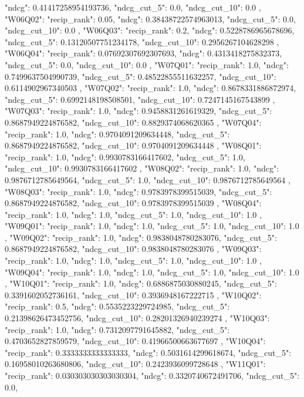 {{  "ndcg": 0.41417258954193736,
  "ndcg_cut_5": 0.0,
  "ndcg_cut_10": 0.0
 },
 "W06Q02": {
  "recip_rank": 0.05,
  "ndcg": 0.38438722574963013,
  "ndcg_cut_5": 0.0,
  "ndcg_cut_10": 0.0
 },
 "W06Q03": {
  "recip_rank": 0.2,
  "ndcg": 0.5228786965678696,
  "ndcg_cut_5": 0.13120507751234178,
  "ndcg_cut_10": 0.2956267104628298
 },
 "W06Q04": {
  "recip_rank": 0.07692307692307693,
  "ndcg": 0.4313418275832373,
  "ndcg_cut_5": 0.0,
  "ndcg_cut_10": 0.0
 },
 "W07Q01": {
  "recip_rank": 1.0,
  "ndcg": 0.7499637504990739,
  "ndcg_cut_5": 0.48522855511632257,
  "ndcg_cut_10": 0.6114902967340503
 },
 "W07Q02": {
  "recip_rank": 1.0,
  "ndcg": 0.8678331886872974,
  "ndcg_cut_5": 0.6992148198508501,
  "ndcg_cut_10": 0.7247145167543899
 },
 "W07Q03": {
  "recip_rank": 1.0,
  "ndcg": 0.9458831261619329,
  "ndcg_cut_5": 0.8687949224876582,
  "ndcg_cut_10": 0.8829374068620365
 },
 "W07Q04": {
  "recip_rank": 1.0,
  "ndcg": 0.9704091209634448,
  "ndcg_cut_5": 0.8687949224876582,
  "ndcg_cut_10": 0.9704091209634448
 },
 "W08Q01": {
  "recip_rank": 1.0,
  "ndcg": 0.9930783166417602,
  "ndcg_cut_5": 1.0,
  "ndcg_cut_10": 0.9930783166417602
 },
 "W08Q02": {
  "recip_rank": 1.0,
  "ndcg": 0.9876712785649564,
  "ndcg_cut_5": 1.0,
  "ndcg_cut_10": 0.9876712785649564
 },
 "W08Q03": {
  "recip_rank": 1.0,
  "ndcg": 0.9783978399515039,
  "ndcg_cut_5": 0.8687949224876582,
  "ndcg_cut_10": 0.9783978399515039
 },
 "W08Q04": {
  "recip_rank": 1.0,
  "ndcg": 1.0,
  "ndcg_cut_5": 1.0,
  "ndcg_cut_10": 1.0
 },
 "W09Q01": {
  "recip_rank": 1.0,
  "ndcg": 1.0,
  "ndcg_cut_5": 1.0,
  "ndcg_cut_10": 1.0
 },
 "W09Q02": {
  "recip_rank": 1.0,
  "ndcg": 0.9838048780283076,
  "ndcg_cut_5": 0.8687949224876582,
  "ndcg_cut_10": 0.9838048780283076
 },
 "W09Q03": {
  "recip_rank": 1.0,
  "ndcg": 1.0,
  "ndcg_cut_5": 1.0,
  "ndcg_cut_10": 1.0
 },
 "W09Q04": {
  "recip_rank": 1.0,
  "ndcg": 1.0,
  "ndcg_cut_5": 1.0,
  "ndcg_cut_10": 1.0
 },
 "W10Q01": {
  "recip_rank": 1.0,
  "ndcg": 0.6886875030880245,
  "ndcg_cut_5": 0.3391602052736161,
  "ndcg_cut_10": 0.3936948167222715
 },
 "W10Q02": {
  "recip_rank": 0.5,
  "ndcg": 0.5535223229724985,
  "ndcg_cut_5": 0.21398626473452756,
  "ndcg_cut_10": 0.28201326940239274
 },
 "W10Q03": {
  "recip_rank": 1.0,
  "ndcg": 0.7312097791645882,
  "ndcg_cut_5": 0.4703652827859579,
  "ndcg_cut_10": 0.41966500663677697
 },
 "W10Q04": {
  "recip_rank": 0.3333333333333333,
  "ndcg": 0.5031614299618674,
  "ndcg_cut_5": 0.16958010263680806,
  "ndcg_cut_10": 0.2423936099728648
 },
 "W11Q01": {
  "recip_rank": 0.030303030303030304,
  "ndcg": 0.3320740672491706,
  "ndcg_cut_5": 0.0,
}}
